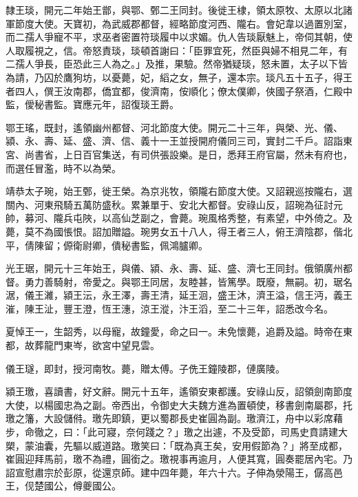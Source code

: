 \begin{pinyinscope}
 隸王琰，開元二年始王鄫，與鄂、鄄二王同封。後徙王棣，領太原牧、太原以北諸軍節度大使。天寶初，為武威郡都督，經略節度河西、隴右。會妃韋以過置別室，而二孺人爭寵不平，求巫者密置符琰履中以求媚。仇人告琰厭魅上，帝伺其朝，使人取履視之，信。帝怒責琰，琰頓首謝曰：「臣罪宜死，然臣與婦不相見二年，有二孺人爭長，臣恐此三人為之。」及推，果驗。然帝猶疑琰，怒未置，太子以下皆為請，乃囚於鷹狗坊，以憂薨，妃，縚之女，無子，還本宗。琰凡五十五子，得王者四人，僎王汝南郡，僑宜都，俊濟南，侒順化；僚太僕卿，俠國子祭酒，仁殿中監，僾秘書監。寶應元年，詔復琰王爵。



 鄂王瑤，既封，遙領幽州都督、河北節度大使。開元二十三年，與榮、光、儀、潁、永、壽、延、盛、濟、信、義十一王並授開府儀同三司，實封二千戶。詔詣東宮、尚書省，上日百官集送，有司供張設樂。是日，悉拜王府官屬，然未有府也，而選任冒濫，時不以為榮。



 靖恭太子琬，始王鄄，徙王榮。為京兆牧，領隴右節度大使。又詔親巡按隴右，選關內、河東飛騎五萬防盛秋。累兼單于、安北大都督。安祿山反，詔琬為征討元帥，募河、隴兵屯陜，以高仙芝副之，會薨。琬風格秀整，有素望，中外倚之。及薨，莫不為國悵恨。詔加贈謚。琬男女五十八人，得王者三人，俯王濟陰郡，偕北平，倩陳留；傆衛尉卿，僓秘書監，佩鴻臚卿。



 光王琚，開元十三年始王，與儀、潁、永、壽、延、盛、濟七王同封。俄領廣州都督。勇力善騎射，帝愛之。與鄂王同居，友睦甚，皆篤學。既廢，無嗣。初，琚名涺，儀王濰，潁王沄，永王澤，壽王清，延王洄，盛王沐，濟王溢，信王沔，義王漼，陳王沚，豐王澄，恆王潓，涼王漎，汴王滔，至二十三年，詔悉改今名。



 夏悼王一，生韶秀，以母寵，故鐘愛，命之曰一。未免懷薨，追爵及謚。時帝在東都，故葬龍門東岑，欲宮中望見雲。



 儀王璲，即封，授河南牧。薨，贈太傅。子侁王鐘陵郡，僆廣陵。



 潁王璬，喜讀書，好文辭。開元十五年，遙領安東都護。安祿山反，詔領劍南節度大使，以楊國忠為之副。帝西出，令御史大夫魏方進為置頓使，移書劍南屬郡，托璬之籓，大設儲偫。璬先即鎮，更以蜀郡長史崔圓為副。璬濟江，舟中以彩席藉步，命徹之，曰：「此可寢，奈何踐之？」璬之出遽，不及受節，司馬史賁請建大槊，蒙油囊，先驅以威道路。璬笑曰：「既為真王矣，安用假節為？」將至成都，崔圓迎拜馬前，璬不為禮，圓銜之。璬視事再逾月，人便其寬，圓奏罷居內宅。乃詔宣慰肅宗於彭原，從還京師。建中四年薨，年六十六。子伸為滎陽王，僝高邑王，伣楚國公，僔夔國公。




\end{pinyinscope}
